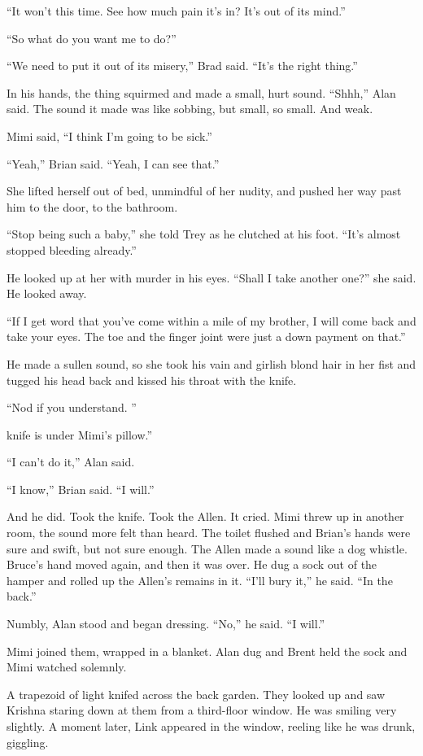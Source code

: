 ``It won't this time.  See how much pain it's in?  It's out of its
mind.''

``So what do you want me to do?''

``We need to put it out of its misery,'' Brad said.  ``It's the right
thing.''

In his hands, the thing squirmed and made a small, hurt sound. 
``Shhh,'' Alan said.  The sound it made was like sobbing, but small,
so small.  And weak.

Mimi said, ``I think I'm going to be sick.''

``Yeah,'' Brian said.  ``Yeah, I can see that.''

She lifted herself out of bed, unmindful of her nudity, and pushed her
way past him to the door, to the bathroom.

``Stop being such a baby,'' she told Trey as he clutched at his foot. 
``It's almost stopped bleeding already.''

He looked up at her with murder in his eyes.  ``Shall I take another
one?'' she said.  He looked away.

``If I get word that you've come within a mile of my brother, I will
come back and take your eyes.  The toe and the finger joint were just
a down payment on that.''

He made a sullen sound, so she took his vain and girlish blond hair in
her fist and tugged his head back and kissed his throat with the
knife.

``Nod if you understand.  ''

knife is under Mimi's pillow.''

``I can't do it,'' Alan said. 

``I know,'' Brian said.  ``I will.''

And he did.  Took the knife.  Took the Allen.  It cried.  Mimi threw
up in another room, the sound more felt than heard.  The toilet
flushed and Brian's hands were sure and swift, but not sure enough. 
The Allen made a sound like a dog whistle.  Bruce's hand moved again,
and then it was over.  He dug a sock out of the hamper and rolled up
the Allen's remains in it.  ``I'll bury it,'' he said.  ``In the
back.''

Numbly, Alan stood and began dressing.  ``No,'' he said.  ``I will.''

Mimi joined them, wrapped in a blanket.  Alan dug and Brent held the
sock and Mimi watched solemnly. 

A trapezoid of light knifed across the back garden.  They looked up
and saw Krishna staring down at them from a third-floor window.  He
was smiling very slightly.  A moment later, Link appeared in the
window, reeling like he was drunk, giggling.

